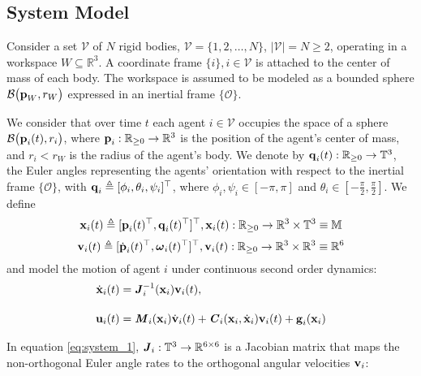 \subsection{System Model}

Consider a set $\mathcal{V}$ of $N$ rigid bodies,
$\mathcal{V} = \{ 1,2, \ldots, N\}$, $|\mathcal{V}| = N \geq 2$, operating in
a workspace $W\subseteq \mathbb{R}^3$. A coordinate frame
$\{i\}, i\in\mathcal{V}$ is attached to the center of mass of each body.
The workspace is assumed to be modeled as a
bounded sphere $\mathcal{B}\big(\bm{\mathbf{p}}_W,r_W\big)$ expressed in an inertial frame
$\{\mathcal{O}\}$.

We consider that over time $t$ each agent $i \in \mathcal{V}$ occupies the
space of a sphere $\mathcal{B}\big(\bm{\mathbf{p}}_i(t), r_i\big)$, where
$\bm{\mathbf{p}}_i : \mathbb{R}_{\geq 0} \to \mathbb{R}^3$
is the position of the agent's center of mass, and $r_i < r_W$ is the radius of the
agent's body. We denote by $\bm{\mathbf{q}}_i(t):\mathbb{R}_{\geq 0} \to \mathbb{T}^3$,
the Euler angles representing the agents' orientation with respect to the
inertial frame $\{\mathcal{O}\}$,
with $\bm{\mathbf{q}}_i \triangleq [\phi_i,\theta_i,\psi_i]^{\top}$, where
$\phi_i, \psi_i \in [-\pi, \pi]$ and
$\theta_i \in [-\frac{\pi}{2}, \frac{\pi}{2}]$. We define
$$\bm{\mathbf{x}}_i (t)\triangleq [\bm{\mathbf{p}}_i(t)^{\top},\bm{\mathbf{q}}_i(t)^{\top}]^{\top},
\bm{\mathbf{x}}_i(t):\mathbb{R}_{\geq 0} \to \mathbb{R}^3\times \mathbb{T}^3 \equiv \mathbb{M}$$
$$\bm{\mathbf{v}}_i(t) \triangleq [\dot{\bm{\mathbf{p}}}_i(t)^{\top}, \bm{\mathbf{\omega}}_i(t)^{\top}]^{\top},
\bm{\mathbf{v}}_i(t) : \mathbb{R}_{\geq 0} \to \mathbb{R}^3\times \mathbb{R}^3 \equiv \mathbb{R}^6$$
and model the motion of agent $i$ under continuous second order dynamics:
\begin{subequations}
	\begin{align}
    \dot{\bm{\mathbf{x}}}_i(t) &= \bm{\mathit{J}}_i^{-1}(\bm{\mathbf{x}}_i) \bm{\mathbf{v}}_i(t), \label{eq:system_1} \\[2.5ex]
    \bm{\mathbf{u}}_i(t) &= \bm{\mathit{M}}_i(\bm{\mathbf{x}}_i) \dot{\bm{\mathbf{v}}}_i(t) +
      \bm{\mathit{C}}_i(\bm{\mathbf{x}}_i,\dot{\bm{\mathbf{x}}}_i) \bm{\mathbf{v}}_i(t)+\bm{\mathbf{g}}_i(\bm{\mathbf{x}}_i) \label{eq:system_2}
	\end{align}
  \label{eq:system}
\end{subequations}

In equation \eqref{eq:system_1}, $\bm{\mathit{J}}_i:\mathbb{T}^3 \to \mathbb{R}^{6\times6}$ is
a Jacobian matrix that maps the non-orthogonal Euler angle rates to the
orthogonal angular velocities $\bm{\mathbf{v}}_i$:

